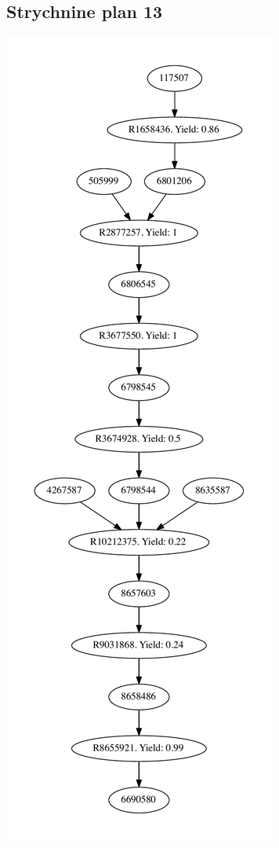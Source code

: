\documentclass[a4paper,10pt,titlepage]{paper}
\begin{document}
\subsection{Strychnine plan 13}
\centering
\includegraphics[scale=0.4]{Synteseplaner/Strychnine/plan13.pdf}
\label{Appendix::Strychnine13}
\end{document}
